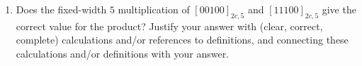 \begin{enumerate}
\begin{enumerate}
        \item Does the fixed-width $5$ multiplication of $[00100]_{2c,5}$ and 
        $[11100]_{2c,5}$ give the correct value for the product?
        Justify your answer  
        with (clear, correct, complete) calculations and/or references to definitions, 
        and connecting these
        calculations and/or definitions with
        your answer.
    \end{enumerate}
    
\end{enumerate}
